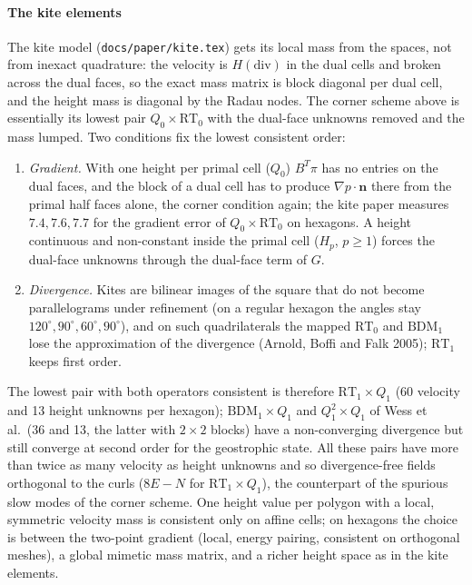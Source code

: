 \documentclass[11pt,a4paper]{article}
\newcommand{\code}[1]{\texttt{#1}}
\newcommand{\bn}{\mathbf{n}}
\begin{document}
\paragraph{The kite elements} The kite model (\code{docs/paper/kite.tex}) gets its local mass from the
spaces, not from inexact quadrature: the velocity is $H(\mathrm{div})$ in the dual cells and broken across
the dual faces, so the exact mass matrix is block diagonal per dual cell, and the height mass is diagonal
by the Radau nodes. The corner scheme above is essentially its lowest pair $Q_0\times\mathrm{RT}_0$ with the
dual-face unknowns removed and the mass lumped. Two conditions fix the lowest consistent order:
\begin{enumerate}
\item \emph{Gradient.} With one height per primal cell ($Q_0$) $B^T\pi$ has no entries on the dual faces,
  and the block of a dual cell has to produce $\nabla p\cdot\bn$ there from the primal half faces alone,
  the corner condition again; the kite paper measures $7.4, 7.6, 7.7$ for the gradient error of
  $Q_0\times\mathrm{RT}_0$ on hexagons. A height continuous and non-constant inside the primal cell
  ($H_p$, $p\ge1$) forces the dual-face unknowns through the dual-face term of $G$.
\item \emph{Divergence.} Kites are bilinear images of the square that do not become parallelograms under
  refinement (on a regular hexagon the angles stay $120^\circ, 90^\circ, 60^\circ, 90^\circ$), and on such
  quadrilaterals the mapped $\mathrm{RT}_0$ and $\mathrm{BDM}_1$ lose the approximation of the divergence
  (Arnold, Boffi and Falk 2005); $\mathrm{RT}_1$ keeps first order.
\end{enumerate}
The lowest pair with both operators consistent is therefore $\mathrm{RT}_1\times Q_1$ (60 velocity and
13 height unknowns per hexagon); $\mathrm{BDM}_1\times Q_1$ and $Q_1^2\times Q_1$ of Wess et al.\ (36 and
13, the latter with $2\times2$ blocks) have a non-converging divergence but still converge at second
order for the geostrophic state. All these pairs have more than twice as many velocity as height
unknowns and so divergence-free fields orthogonal to the curls ($8E - N$ for $\mathrm{RT}_1\times Q_1$),
the counterpart of the spurious slow modes of the corner scheme. One height value per polygon with a
local, symmetric velocity mass is consistent only on affine cells; on hexagons the choice is between the
two-point gradient (local, energy pairing, consistent on orthogonal meshes), a global mimetic mass matrix,
and a richer height space as in the kite elements.
\end{document}
